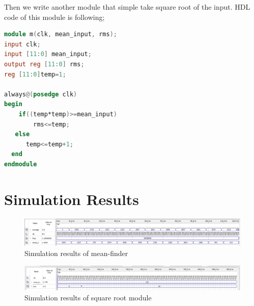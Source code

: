 \documentclass[10pt]{article}
\begin{document}
Then we write another module that simple take square root of the input. HDL code of this module is following;

\begin{lstlisting}[language=Verilog, caption=Square-root module]
module m(clk, mean_input, rms);
input clk;
input [11:0] mean_input;
output reg [11:0] rms;
reg [11:0]temp=1;

always@(posedge clk)
begin
	if((temp*temp)>=mean_input)
		rms<=temp;
   else
      temp<=temp+1;
  end
endmodule
\end{lstlisting}
\section*{Simulation Results}
\begin{figure}[H]
  \includegraphics[scale=0.5, center]{Mean_finder}
  \caption{Simulation results of mean-finder}
  \label{fig:zero}
\end{figure}


\begin{figure}[H]
  \includegraphics[scale=0.5, center]{Rms_out}
  \caption{Simulation results of square root module}
  \label{fig:zero}
\end{figure}
\end{document}
